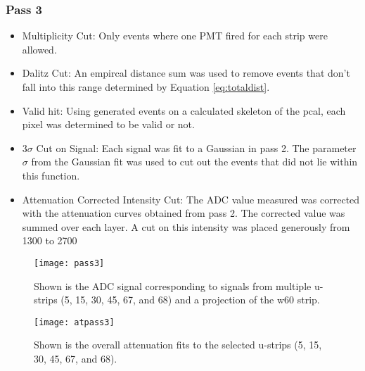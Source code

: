 \subsubsection{Pass 3}
\begin{itemize}
    \item Multiplicity Cut: Only events where one PMT fired for each strip were allowed.
    \item Dalitz Cut: An empircal distance sum was used to remove events that don't fall 
    into this range determined by Equation \ref{eq:totaldist}.
    \item Valid hit: Using generated events on a calculated skeleton of the pcal, each 
    pixel was determined to be valid or not.
    \item 3$\sigma$ Cut on Signal: Each signal was fit to a Gaussian in pass 2. The parameter 
    $\sigma$ from the Gaussian fit was used to cut out the events that did not lie within this function.
    \item Attenuation Corrected Intensity Cut: The ADC value measured was corrected with the 
    attenuation curves obtained from pass 2. The corrected value was summed over each layer. 
    A cut on this intensity was placed generously from 1300 to 2700
\end{itemize}

\begin{figure}[h]
    \centering
    \texttt{[image: pass3]}
    \caption{Shown is the ADC signal corresponding to signals from multiple u-strips 
    (5, 15, 30, 45, 67, and 68) and a projection of the w60 strip.}
    \label{fig:pass3}
\end{figure}

\begin{figure}[h]
    \centering
    \texttt{[image: atpass3]}
    \caption{Shown is the overall attenuation fits to the selected u-strips 
    (5, 15, 30, 45, 67, and 68).}
    \label{fig:atpass3}
\end{figure}

\clearpage
\FloatBarrier
